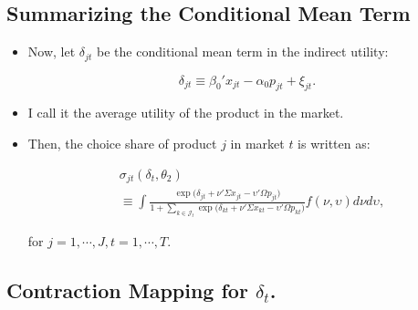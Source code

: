 \documentclass[]{book}
\providecommand{\tightlist}{%
  \setlength{\itemsep}{0pt}\setlength{\parskip}{0pt}}
\begin{document}
\subsection{Summarizing the Conditional Mean
Term}\label{summarizing-the-conditional-mean-term}

\begin{itemize}
\tightlist
\item
  Now, let \(\delta_{jt}\) be the conditional mean term in the indirect
  utility:

  \begin{equation}
  \delta_{jt} \equiv \beta_0' x_{jt} - \alpha_0 p_{jt} + \xi_{jt}.
  \end{equation}
\item
  I call it the average utility of the product in the market.
\item
  Then, the choice share of product \(j\) in market \(t\) is written as:

  \begin{equation}
  \begin{split}
  &\sigma_{jt}(\delta_t, \theta_2) \\
  &\equiv \int \frac{\exp\Bigg(\delta_{jt} + \nu' \Sigma x_{jt} - \upsilon' \Omega p_{jt}\Bigg)}{1 + \sum_{k \in \mathcal{J}_t} \exp\Bigg(\delta_{kt} + \nu' \Sigma x_{kt} - \upsilon' \Omega p_{kt}\Bigg)} f(\nu, \upsilon) d\nu d\upsilon,
  \end{split}
  \end{equation}

  for \(j = 1, \cdots, J, t = 1, \cdots, T\).
\end{itemize}

\subsection{\texorpdfstring{Contraction Mapping for
\(\delta_t\).}{Contraction Mapping for \textbackslash{}delta\_t.}}\label{contraction-mapping-for-delta_t.}
\end{document}
